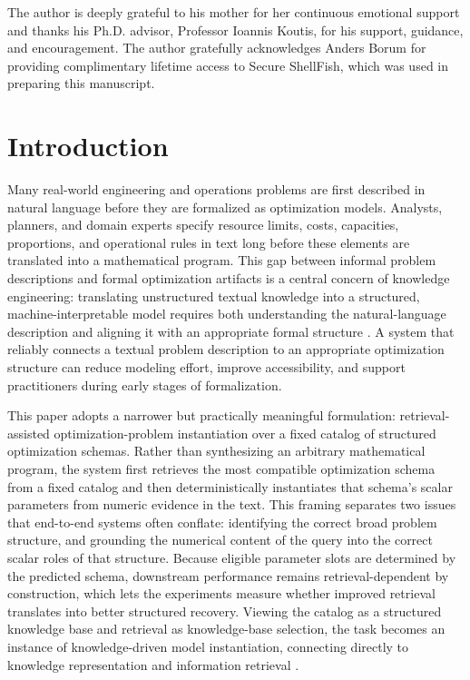 \documentclass[pdflatex,sn-basic,Numbered]{sn-jnl}
\begin{document}

\maketitle


The author is deeply grateful to his mother for her continuous emotional support and thanks his Ph.D. advisor, Professor Ioannis Koutis, for his support, guidance, and encouragement. The author gratefully acknowledges Anders Borum for providing complimentary lifetime access to Secure ShellFish, which was used in preparing this manuscript.

\section{Introduction}

Many real-world engineering and operations problems are first described in natural language before they are formalized as optimization models. Analysts, planners, and domain experts specify resource limits, costs, capacities, proportions, and operational rules in text long before these elements are translated into a mathematical program. This gap between informal problem descriptions and formal optimization artifacts is a central concern of knowledge engineering: translating unstructured textual knowledge into a structured, machine-interpretable model requires both understanding the natural-language description and aligning it with an appropriate formal structure \cite{affolter2019nli,ramamonjison2022autoformulation,ramamonjison2023nl4opt}. A system that reliably connects a textual problem description to an appropriate optimization structure can reduce modeling effort, improve accessibility, and support practitioners during early stages of formalization.

This paper adopts a narrower but practically meaningful formulation: retrieval-assisted optimization-problem instantiation over a fixed catalog of structured optimization schemas. Rather than synthesizing an arbitrary mathematical program, the system first retrieves the most compatible optimization schema from a fixed catalog and then deterministically instantiates that schema's scalar parameters from numeric evidence in the text. This framing separates two issues that end-to-end systems often conflate: identifying the correct broad problem structure, and grounding the numerical content of the query into the correct scalar roles of that structure. Because eligible parameter slots are determined by the predicted schema, downstream performance remains retrieval-dependent by construction, which lets the experiments measure whether improved retrieval translates into better structured recovery. Viewing the catalog as a structured knowledge base and retrieval as knowledge-base selection, the task becomes an instance of knowledge-driven model instantiation, connecting directly to knowledge representation and information retrieval \cite{nlp4lp_dataset,ahmaditeshnizi2024optimus_icml,sheetrit2024rematch}.
\end{document}
